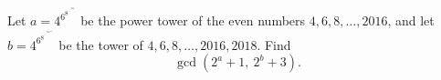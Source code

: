 Let $a=4^{6^{8^{\cdot^{\cdot^{\cdot^{2016}}}}}}$ be the power tower of the even numbers $4,6,8,\dots,2016$, and let $b=4^{6^{8^{\cdot^{\cdot^{\cdot^{2016^{2018}}}}}}}$ be the tower of $4,6,8,\dots,2016,2018$. Find
\[\gcd\left(2^{a}+1,\ 2^{b}+3\right).\]
